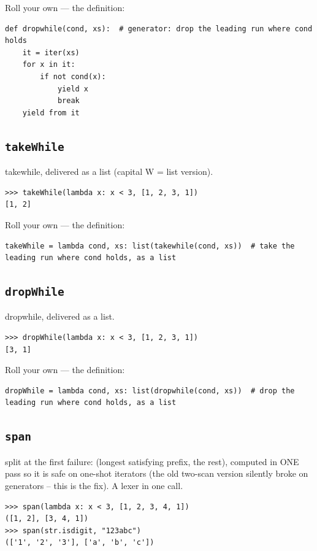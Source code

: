 \documentclass[10pt,letterpaper]{book}
\begin{document}
Roll your own --- the definition:

\begin{lstlisting}[style=ex]
def dropwhile(cond, xs):  # generator: drop the leading run where cond holds
    it = iter(xs)
    for x in it:
        if not cond(x):
            yield x
            break
    yield from it
\end{lstlisting}
\subsection{\texttt{takeWhile}}\label{def:takeWhile}
takewhile, delivered as a list (capital W = list version).
\begin{lstlisting}[style=ex]
>>> takeWhile(lambda x: x < 3, [1, 2, 3, 1])
[1, 2]
\end{lstlisting}

Roll your own --- the definition:

\begin{lstlisting}[style=ex]
takeWhile = lambda cond, xs: list(takewhile(cond, xs))  # take the leading run where cond holds, as a list
\end{lstlisting}
\subsection{\texttt{dropWhile}}\label{def:dropWhile}
dropwhile, delivered as a list.
\begin{lstlisting}[style=ex]
>>> dropWhile(lambda x: x < 3, [1, 2, 3, 1])
[3, 1]
\end{lstlisting}

Roll your own --- the definition:

\begin{lstlisting}[style=ex]
dropWhile = lambda cond, xs: list(dropwhile(cond, xs))  # drop the leading run where cond holds, as a list
\end{lstlisting}
\subsection{\texttt{span}}\label{def:span}
split at the first failure: (longest satisfying prefix, the rest), computed in ONE pass so it is safe on one-shot iterators (the old two-scan version silently broke on generators -- this is the fix). A lexer in one call.
\begin{lstlisting}[style=ex]
>>> span(lambda x: x < 3, [1, 2, 3, 4, 1])
([1, 2], [3, 4, 1])
>>> span(str.isdigit, "123abc")
(['1', '2', '3'], ['a', 'b', 'c'])
\end{lstlisting}
\end{document}
